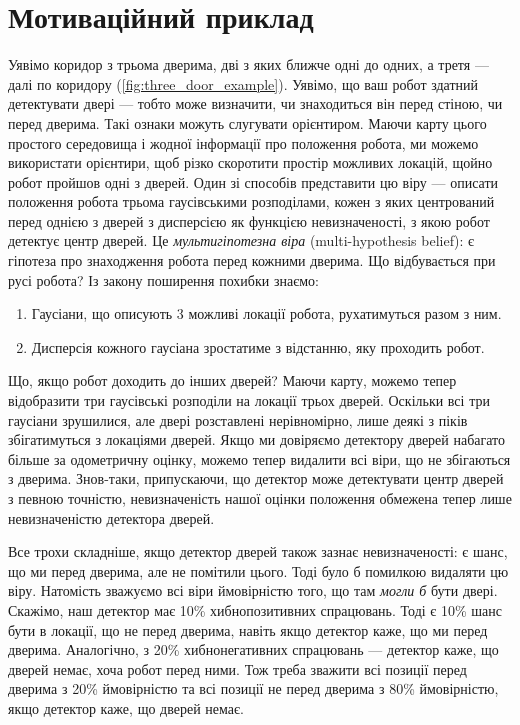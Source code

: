 \section{Мотиваційний приклад}
Уявімо коридор з трьома дверима, дві з яких ближче одні до одних, а третя — далі по коридору (\cref{fig:three_door_example}). Уявімо, що ваш робот здатний детектувати двері — тобто може визначити, чи знаходиться він перед стіною, чи перед дверима. Такі ознаки можуть слугувати орієнтиром. Маючи карту цього простого середовища і жодної інформації про положення робота, ми можемо використати орієнтири, щоб різко скоротити простір можливих локацій, щойно робот пройшов одні з дверей. Один зі способів представити цю віру — описати положення робота трьома гаусівськими розподілами, кожен з яких центрований перед однією з дверей з дисперсією як функцією невизначеності, з якою робот детектує центр дверей. Це \emph{мультигіпотезна віра} (multi-hypothesis belief): є гіпотеза про знаходження робота перед кожними дверима. Що відбувається при русі робота? Із закону поширення похибки знаємо:
\begin{enumerate}
\item Гаусіани, що описують 3 можливі локації робота, рухатимуться разом з ним.
\item Дисперсія кожного гаусіана зростатиме з відстанню, яку проходить робот.
\end{enumerate}
Що, якщо робот доходить до інших дверей? Маючи карту, можемо тепер відобразити три гаусівські розподіли на локації трьох дверей. Оскільки всі три гаусіани зрушилися, але двері розставлені нерівномірно, лише деякі з піків збігатимуться з локаціями дверей. Якщо ми довіряємо детектору дверей набагато більше за одометричну оцінку, можемо тепер видалити всі віри, що не збігаються з дверима. Знов-таки, припускаючи, що детектор може детектувати центр дверей з певною точністю, невизначеність нашої оцінки положення обмежена тепер лише невизначеністю детектора дверей.

Все трохи складніше, якщо детектор дверей також зазнає невизначеності: є шанс, що ми перед дверима, але не помітили цього. Тоді було б помилкою видаляти цю віру. Натомість зважуємо всі віри ймовірністю того, що там \emph{могли б} бути двері. Скажімо, наш детектор має 10\% хибнопозитивних спрацювань. Тоді є 10\% шанс бути в локації, що не перед дверима, навіть якщо детектор каже, що ми перед дверима. Аналогічно, з 20\% хибнонегативних спрацювань — детектор каже, що дверей немає, хоча робот перед ними. Тож треба зважити всі позиції перед дверима з 20\% ймовірністю та всі позиції не перед дверима з 80\% ймовірністю, якщо детектор каже, що дверей немає.

